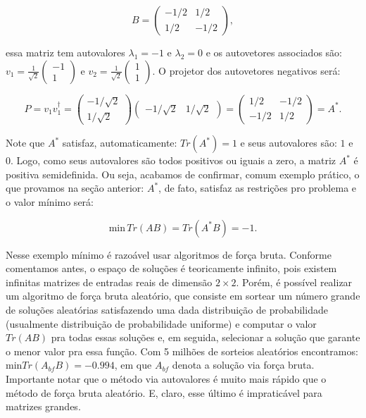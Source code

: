 \documentclass[11pt]{article}
\begin{document}
\begin{equation} B = \begin{pmatrix} -1/2 & 1/2 \\ 1/2 & -1/2 \end{pmatrix} \label{eq4} \tag{4}, \end{equation}

essa matriz tem autovalores \(\lambda_1 = -1\) e \(\lambda_2 = 0\) e os
autovetores associados são:
\(v_1 = \frac{1}{\sqrt{2}}\begin{pmatrix} -1 \\ 1\end{pmatrix}\) e
\(v_2 = \frac{1}{\sqrt{2}}\begin{pmatrix} 1 \\ 1\end{pmatrix}\). O
projetor dos autovetores negativos será:

\begin{equation} P = v_1v_1^{\dagger} = \begin{pmatrix} -1/\sqrt{2} \\ 1/\sqrt{2}\end{pmatrix}\begin{pmatrix} -1/\sqrt{2} & 1/\sqrt{2}\end{pmatrix} = \begin{pmatrix} 1/2 & -1/2 \\ -1/2 & 1/2\end{pmatrix} = A^*. \label{eq5} \tag{5} \end{equation}

Note que \(A^*\) satisfaz, automaticamente: \(Tr(A^*) = 1\) e seus
autovalores são: \(1\) e \(0\). Logo, como seus autovalores são todos
positivos ou iguais a zero, a matriz \(A^*\) é positiva semidefinida. Ou
seja, acabamos de confirmar, comum exemplo prático, o que provamos na
seção anterior: \(A^*\), de fato, satisfaz as restrições pro problema e
o valor mínimo será:

\begin{equation} \text{min}\, Tr(AB) = Tr(A^*B) = -1. \label{eq6} \tag{6} \end{equation}

Nesse exemplo mínimo é razoável usar algoritmos de força bruta. Conforme
comentamos antes, o espaço de soluções é teoricamente infinito, pois
existem infinitas matrizes de entradas reais de dimensão \(2\times 2\).
Porém, é possível realizar um algoritmo de força bruta aleatório, que
consiste em sortear um número grande de soluções aleatórias satisfazendo
uma dada distribuição de probabilidade (usualmente distribuição de
probabilidade uniforme) e computar o valor \(Tr(AB)\) pra todas essas
soluções e, em seguida, selecionar a solução que garante o menor valor
pra essa função. Com 5 milhões de sorteios aleatórios encontramos:
\(\text{min} Tr(A_{bf}B) = -0.994\), em que \(A_{bf}\) denota a solução
via força bruta. Importante notar que o método via autovalores é muito
mais rápido que o método de força bruta aleatório. E, claro, esse último
é impraticável para matrizes grandes.
\end{document}
